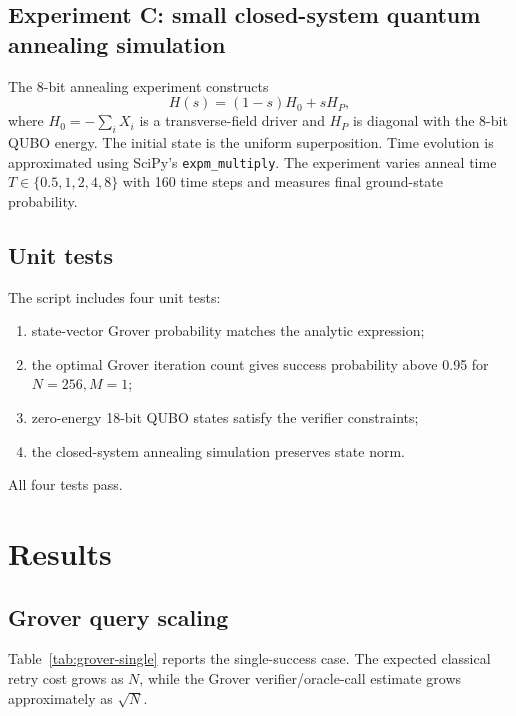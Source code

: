 \documentclass[11pt]{article}
\begin{document}
\subsection{Experiment C: small closed-system quantum annealing simulation}

The 8-bit annealing experiment constructs
\begin{equation}
  H(s)=(1-s)H_0+sH_P,
\end{equation}
where $H_0=-\sum_i X_i$ is a transverse-field driver and $H_P$ is diagonal with the 8-bit QUBO energy. The initial state is the uniform superposition. Time evolution is approximated using SciPy's \texttt{expm\_multiply}. The experiment varies anneal time $T\in\{0.5,1,2,4,8\}$ with 160 time steps and measures final ground-state probability.

\subsection{Unit tests}

The script includes four unit tests:
\begin{enumerate}
  \item state-vector Grover probability matches the analytic expression;
  \item the optimal Grover iteration count gives success probability above 0.95 for $N=256,M=1$;
  \item zero-energy 18-bit QUBO states satisfy the verifier constraints;
  \item the closed-system annealing simulation preserves state norm.
\end{enumerate}
All four tests pass.

\section{Results}

\subsection{Grover query scaling}

Table~\ref{tab:grover-single} reports the single-success case. The expected classical retry cost grows as $N$, while the Grover verifier/oracle-call estimate grows approximately as $\sqrt{N}$.
\end{document}

